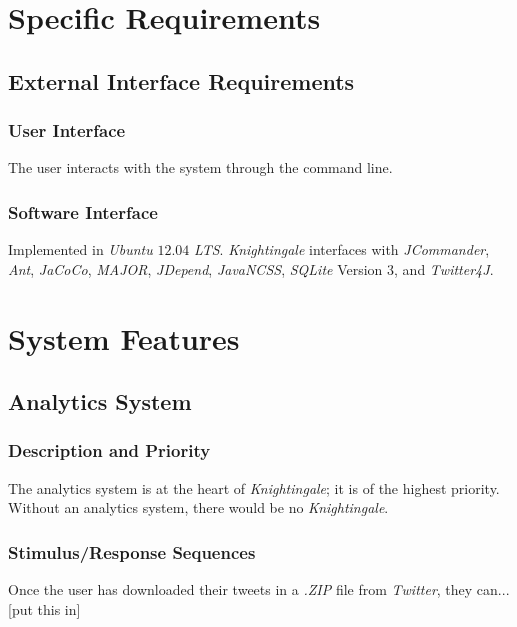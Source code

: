 \documentclass[a4paper, 12pt]{article}
\begin{document}
\section{Specific Requirements} \label{sec:specificreq}
\subsection{External Interface Requirements} \label{sec:eir}
\subsubsection{User Interface} \label{sec:ui}
\begin{adjustwidth}{3em}{0pt}
The user interacts with the system through the command line. \newline
\end{adjustwidth}

\subsubsection{Software Interface} \label{sec:softi}
\begin{adjustwidth}{3em}{0pt}
Implemented in \textit{Ubuntu} $12.04$ \textit{LTS}. \textit{Knightingale} interfaces with \textit{JCommander}, \textit{Ant}, \textit{JaCoCo}, \textit{MAJOR}, \textit{JDepend}, \textit{JavaNCSS}, \textit{SQLite} Version $3$, and \textit{Twitter4J}.
\end{adjustwidth}

\section{System Features} \label{sec:sysfeat}
\subsection{Analytics System} \label{sec:analytics}
\subsubsection{Description and Priority} \label{sec:description}
\begin{adjustwidth}{3em}{0pt}
The analytics system is at the heart of \textit{Knightingale}; it is of the highest priority. Without an analytics system, there would be no \textit{Knightingale}.
\end{adjustwidth}

\subsubsection{Stimulus/Response Sequences} \label{sec:stimulus}
\begin{adjustwidth}{3em}{0pt}
Once the user has downloaded their tweets in a \textit{.ZIP} file from \textit{Twitter}, they can...[put this in]
\end{adjustwidth}
\end{document}
